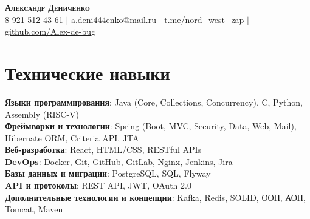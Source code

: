 \documentclass[letterpaper,11pt]{article}
\begin{document}


\begin{center}
    \textbf{\Huge \scshape Александр Дениченко} \\ \vspace{1pt}
    \small 8-921-512-43-61 $|$ \href{mailto:a.deni444enko@mail.ru}{\underline{a.deni444enko@mail.ru}} $|$ 
    \href{https://t.me/nord_west_zap}{\underline{t.me/nord\_west\_zap}} $|$
    \href{https://github.com/Alex-de-bug}{\underline{github.com/Alex-de-bug}}
\end{center}

\section{Технические навыки}
 \begin{itemize}[leftmargin=0.15in, label={}]
    \small{\item{
     \textbf{Языки программирования}{: Java (Core, Collections, Concurrency), C, Python, Assembly (RISC-V)} \\
     \textbf{Фреймворки и технологии}{: Spring (Boot, MVC, Security, Data, Web, Mail), Hibernate ORM, Criteria API, JTA} \\
     \textbf{Веб-разработка}{: React, HTML/CSS, RESTful APIs} \\
     \textbf{DevOps}{: Docker, Git, GitHub, GitLab, Nginx, Jenkins, Jira} \\
     \textbf{Базы данных и миграции}{: PostgreSQL, SQL, Flyway} \\
     \textbf{API и протоколы}{: REST API, JWT, OAuth 2.0} \\
     \textbf{Дополнительные технологии и концепции}{: Kafka, Redis, SOLID, ООП, АОП, Tomcat, Maven}
    }}
 \end{itemize}

\end{document}
